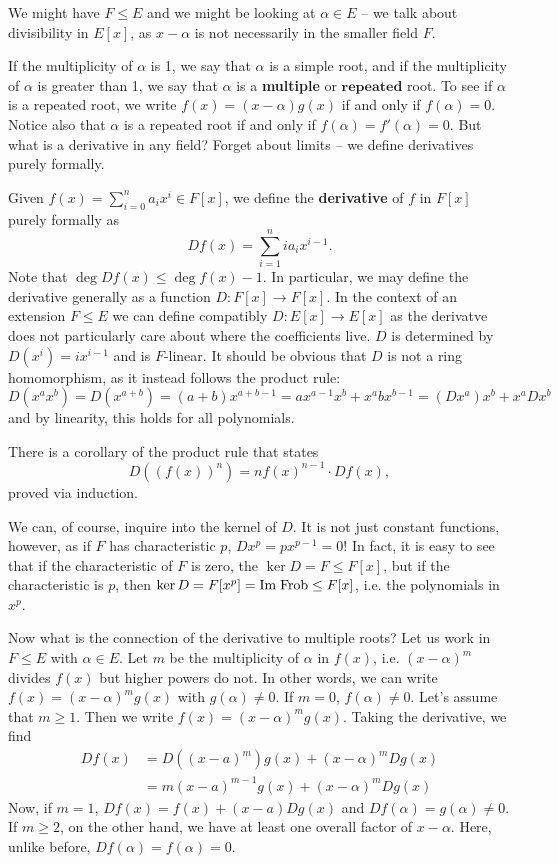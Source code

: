 \documentclass{../mathnotes}
\begin{document}
\begin{rem}
    We might have $F\leq E$ and we might be looking at $\alpha\in E$ -- we talk about divisibility in $E[x]$, as
    $x-\alpha$ is not necessarily in the smaller field $F$.
\end{rem}

If the multiplicity of $\alpha$ is 1, we say that $\alpha$ is a simple root, and if the multiplicity of $\alpha$ is greater than 1, we say
that $\alpha$ is a \textbf{multiple} or $\textbf{repeated}$ root. To see if $\alpha$ is a repeated root, we write $f(x)=(x-\alpha)g(x)$
if and only if $f(\alpha)=0$. Notice also that $\alpha$ is a repeated root if and only if $f(\alpha)=f'(\alpha)=0$. But what is a derivative in
any field? Forget about limits -- we define derivatives purely formally.

\begin{defn}
    Given $f(x)=\sum_{i=0}^na_ix^i\in F[x]$, we define the \textbf{derivative} of $f$ in $F[x]$ purely formally as \[Df(x)=\sum_{i=1}^nia_ix^{i-1}.\]
    Note that $\deg Df(x)\leq \deg f(x)-1$. In particular, we may define the derivative generally as a function $D:F[x]\to F[x]$.
    In the context of an extension $F\leq E$ we can define compatibly $D:E[x]\to E[x]$ as the derivatve does not particularly care about where
    the coefficients live. $D$ is determined by $D(x^i)=ix^{i-1}$ and is $F$-linear. It should be obvious that $D$ is not a ring homomorphism,
    as it instead follows the product rule:
    \[D(x^ax^b)=D(x^{a+b})=(a+b)x^{a+b-1}=ax^{a-1}x^b+x^abx^{b-1}=(Dx^a)x^b+x^aDx^b\]
    and by linearity, this holds for all polynomials.
    
    There is a corollary of the product rule that states
    \[D( (f(x))^n)=nf(x)^{n-1}\cdot Df(x),\]
    proved via induction.

    We can, of course, inquire into the kernel of $D$. It is not just constant functions,
    however, as if $F$ has characteristic $p$, $Dx^p=px^{p-1}=0$! In fact, it is easy to see that if the characteristic of $F$ is zero,
    the $\ker D=F\leq F[x]$, but if the characteristic is $p$, then $\ker D=F[x^p]={\rm Im}\;{\rm Frob}\leq F[x]$, i.e. the polynomials in $x^p$.
\end{defn}

Now what is the connection of the derivative to multiple roots? Let us work in $F\leq E$ with $\alpha\in E$. Let $m$ be the multiplicity
of $\alpha$ in $f(x)$, i.e. $(x-\alpha)^m$ divides $f(x)$ but higher powers do not. In other words, we can write $f(x)=(x-\alpha)^mg(x)$
with $g(\alpha)\neq 0$. If $m=0$, $f(\alpha)\neq 0$. Let's assume that $m\geq 1$. Then we write $f(x)=(x-\alpha)^mg(x)$. Taking the derivative, we find
\begin{align*}
    Df(x)&=D\left( (x-a)^m \right)g(x)+(x-\alpha)^mDg(x)\\
    &= m(x-a)^{m-1}g(x)+(x-\alpha)^mDg(x)
\end{align*}
Now, if $m=1$, $Df(x)=f(x)+(x-a)Dg(x)$ and $Df(\alpha)=g(\alpha)\neq 0$. If $m\geq 2$, on the other hand, we have at least one overall factor of $x-\alpha$.
Here, unlike before, $Df(\alpha)=f(\alpha)=0$.
\end{document}
